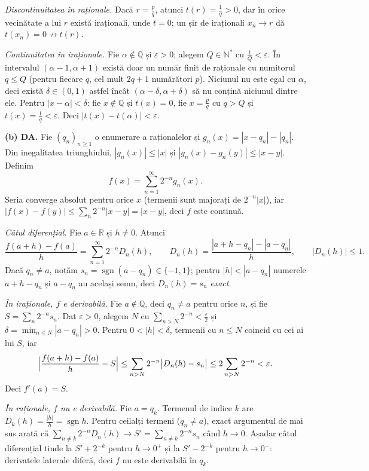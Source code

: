 \emph{Discontinuitatea în raționale.} Dacă $r=\frac pq$, atunci $t(r)=\frac1q>0$, dar în orice vecinătate a lui $r$ există iraționali, unde $t=0$; un șir de iraționali $x_n\to r$ dă $t(x_n)=0\not\to t(r)$.

\emph{Continuitatea în iraționale.} Fie $\alpha\notin\mathbb{Q}$ și $\varepsilon>0$; alegem $Q\in\mathbb{N}^*$ cu $\frac1Q<\varepsilon$. În intervalul $(\alpha-1,\alpha+1)$ există doar un număr finit de raționale cu numitorul $q\le Q$ (pentru fiecare $q$, cel mult $2q+1$ numărători $p$). Niciunul nu este egal cu $\alpha$, deci există $\delta\in(0,1)$ astfel încât $(\alpha-\delta,\alpha+\delta)$ să nu conțină niciunul dintre ele. Pentru $|x-\alpha|<\delta$: fie $x\notin\mathbb{Q}$ și $t(x)=0$, fie $x=\frac pq$ cu $q>Q$ și $t(x)=\frac1q<\varepsilon$. Deci $|t(x)-t(\alpha)|<\varepsilon$.

\textbf{(b) DA.} Fie $(q_n)_{n\ge1}$ o enumerare a raționalelor și $g_n(x)=|x-q_n|-|q_n|$. Din inegalitatea triunghiului, $|g_n(x)|\le|x|$ și $|g_n(x)-g_n(y)|\le|x-y|$. Definim
\[
f(x)=\sum_{n=1}^{\infty}2^{-n}g_n(x) .
\]
Seria converge absolut pentru orice $x$ (termenii sunt majorați de $2^{-n}|x|$), iar $|f(x)-f(y)|\le\sum_n 2^{-n}|x-y|=|x-y|$, deci $f$ este continuă.

\emph{Câtul diferențial.} Fie $a\in\mathbb{R}$ și $h\neq0$. Atunci
\[
\frac{f(a+h)-f(a)}{h}=\sum_{n=1}^{\infty}2^{-n}D_n(h),\qquad D_n(h)=\frac{|a+h-q_n|-|a-q_n|}{h},\qquad |D_n(h)|\le1 .
\]
Dacă $q_n\neq a$, notăm $s_n=\operatorname{sgn}(a-q_n)\in\{-1,1\}$; pentru $|h|<|a-q_n|$ numerele $a+h-q_n$ și $a-q_n$ au același semn, deci $D_n(h)=s_n$ \emph{exact}.

\emph{În iraționale, $f$ e derivabilă.} Fie $a\notin\mathbb{Q}$, deci $q_n\neq a$ pentru orice $n$, și fie $S=\sum_n 2^{-n}s_n$. Dat $\varepsilon>0$, alegem $N$ cu $\sum_{n>N}2^{-n}<\frac\varepsilon2$ și $\delta=\min_{n\le N}|a-q_n|>0$. Pentru $0<|h|<\delta$, termenii cu $n\le N$ coincid cu cei ai lui $S$, iar
\[
\Bigl|\frac{f(a+h)-f(a)}{h}-S\Bigr|\le\sum_{n>N}2^{-n}\bigl|D_n(h)-s_n\bigr|\le2\sum_{n>N}2^{-n}<\varepsilon .
\]
Deci $f'(a)=S$.

\emph{În raționale, $f$ nu e derivabilă.} Fie $a=q_k$. Termenul de indice $k$ are $D_k(h)=\frac{|h|}{h}=\operatorname{sgn}h$. Pentru ceilalți termeni ($q_n\neq a$), exact argumentul de mai sus arată că $\sum_{n\neq k}2^{-n}D_n(h)\to S'=\sum_{n\neq k}2^{-n}s_n$ când $h\to0$. Așadar câtul diferențial tinde la $S'+2^{-k}$ pentru $h\to0^+$ și la $S'-2^{-k}$ pentru $h\to0^-$: derivatele laterale diferă, deci $f$ nu este derivabilă în $q_k$.

